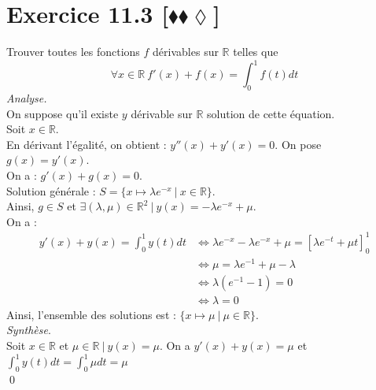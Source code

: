 \documentclass[10pt]{article}
\begin{document}
\section*{Exercice 11.3 [$\blacklozenge\blacklozenge\lozenge$]}
\begin{tcolorbox}[enhanced, width=7in, center, size=fbox, fontupper=\large, drop shadow southwest]
    Trouver toutes les fonctions $f$ dérivables sur $\mathbb{R}$ telles que
    \begin{equation*}
        \forall{x \in \mathbb{R}} ~ f'(x) + f(x) = \int_0^1{f(t)dt}
    \end{equation*}
    \emph{Analyse.}\\[0.1cm]
    On suppose qu'il existe $y$ dérivable sur $\mathbb{R}$ solution de cette équation.\\[0.1cm]
    Soit $x\in\mathbb{R}$.\\
    En dérivant l'égalité, on obtient : $y''(x) + y'(x) = 0$. On pose $g(x)=y'(x)$.\\
    On a : $g'(x) + g(x) = 0$.\\
    Solution générale : $S = \{x\mapsto \lambda e^{-x} ~ | ~ x\in\mathbb{R}\}$.\\
    Ainsi, $g \in S$ et $\exists (\lambda, \mu) \in \mathbb{R}^2 ~ | ~ y(x) = -\lambda e^{-x} + \mu$.\\
    On a :
    \begin{align*}
        y'(x) + y(x) = \int_0^1y(t)dt &\iff \lambda e^{-x} - \lambda e^{-x} + \mu = \left[\lambda e^{-t} + \mu t\right]_0^1\\
        &\iff \mu = \lambda e^{-1} + \mu - \lambda\\
        &\iff \lambda(e^{-1} -1) = 0\\
        &\iff \lambda = 0
    \end{align*}
    Ainsi, l'ensemble des solutions est : $\{x\mapsto\mu ~ | ~ \mu \in \mathbb{R}\}$.\\
    \emph{Synthèse}.\\
    Soit $x\in\mathbb{R}$ et $\mu\in\mathbb{R} ~ | ~ y(x)=\mu$. On a $y'(x) + y(x) = \mu$ et $\int_0^1y(t)dt=\int_0^1\mu dt=\mu$\\
    \qed
\end{tcolorbox}

\end{document}
